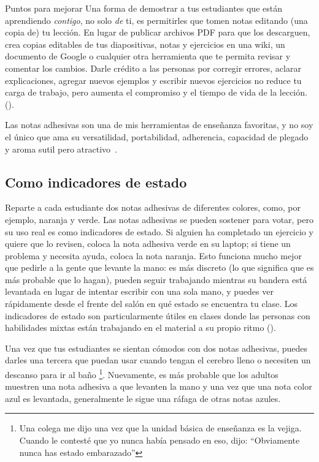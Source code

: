 \begin{aside}{Puntos para mejorar}
  Una forma de demostrar a tus estudiantes que están aprendiendo \emph{contigo},
  no solo \emph{de} ti,
  es permitirles que tomen notas editando (una copia de) tu lección.
  En lugar de publicar archivos PDF para que los descarguen,
  crea copias editables de tus diapositivas, notas y ejercicios
  en una wiki,
  un documento de Google
  o cualquier otra herramienta que te permita revisar y comentar los cambios.
  Darle crédito a las personas por corregir errores,
  aclarar explicaciones,
  agregar nuevos ejemplos
  y escribir nuevos ejercicios no reduce tu carga de trabajo,
  pero aumenta el compromiso y el tiempo de vida de la lección.
  ().
\end{aside}


Las notas adhesivas son una de mis herramientas de enseñanza favoritas,
y no soy el único que ama su versatilidad,
portabilidad, adherencia, capacidad de plegado
y aroma sutil pero atractivo~\cite{Ward2015}.

\subsection*{Como indicadores de estado}

Reparte a cada estudiante dos notas adhesivas de diferentes colores,
como, por ejemplo, naranja y verde.
Las notas adhesivas se pueden sostener para votar,
pero su uso real es como indicadores de estado.
Si alguien ha completado un ejercicio y quiere que lo revisen,
coloca la nota adhesiva verde en su laptop;
si tiene un problema y necesita ayuda,
coloca la nota naranja.
Esto funciona mucho mejor que pedirle a la gente que levante la mano:
es más discreto (lo que significa que es más probable que lo hagan),
pueden seguir trabajando mientras su bandera está levantada en lugar de intentar escribir con una sola mano,
y puedes ver rápidamente desde el frente del salón en qué estado se encuentra tu clase.
Los indicadores de estado son particularmente útiles en clases donde las personas con habilidades mixtas
están trabajando en el material a su propio ritmo ().

Una vez que tus estudiantes se sientan cómodos con dos notas adhesivas,
puedes darles una tercera que puedan usar cuando tengan el cerebro lleno
o necesiten un descanso para ir al baño \footnote{Una colega me dijo una vez que
la unidad básica de enseñanza es la vejiga.
Cuando le contesté que yo nunca había pensado en eso,
dijo: ``Obviamente nunca has estado embarazado''}.
Nuevamente,
es más probable que los adultos muestren una nota adhesiva a que levanten la mano
y una vez que una nota color azul es levantada,
generalmente le sigue una ráfaga de otras notas azules.

